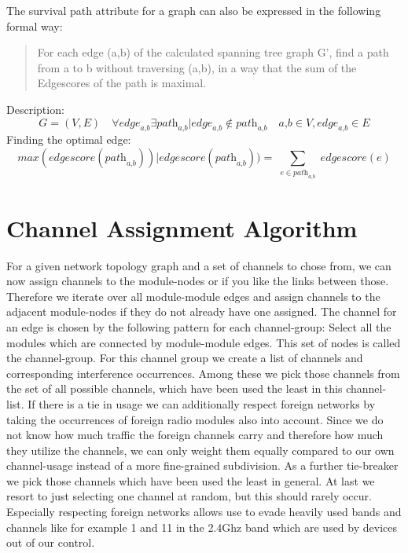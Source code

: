 \newpage

      The survival path attribute for a graph can also be expressed in the following formal way:
      \begin{quote}
	For each edge (a,b) of the calculated spanning tree graph G', find a path from a to b without traversing (a,b), 
	in a way that the sum of the Edgescores of the path is maximal.
      \end{quote}
      Description:
      $$\textit{G}=(\textit{V},\textit{E}) \quad
	\forall \textit{edge}_\textit{a,b} \exists \textit{path}_\textit{a,b} | \textit{edge}_\textit{a,b} \notin \textit{path}_\textit{a,b} \quad
	\textit{a,b} \in \textit{V}, \textit{edge}_\textit{a,b} \in \textit{E}$$
	Finding the optimal edge:
	$$\textit{max}(\textit{edgescore}(\textit{path}_\textit{a,b})) |
	\textit{edgescore}(\textit{path}_\textit{a,b})) = \sum_{\substack{e \in \textit{path}_\textit{a,b}}} \textit{edgescore}(e)$$

  \section{Channel Assignment Algorithm}
    For a given network topology graph and a set of channels to chose from, we can now assign channels to the module-nodes or if you like the links
    between those. Therefore we iterate over all module-module edges and assign channels to the adjacent module-nodes if they do not already have one assigned.
    The channel for an edge is chosen by the following pattern for each channel-group:
    Select all the modules which are connected by module-module edges. This set of nodes is called the channel-group.
    For this channel group we create a list of channels and corresponding interference occurrences.
    Among these we pick those channels from the set of all possible channels, which have been used the least in this channel-list. If there is a tie in usage
    we can additionally respect foreign networks by taking the occurrences of foreign radio modules also into account. Since we do not know how much traffic the foreign 
    channels carry and therefore how much they utilize the channels, we can only weight them equally compared to our own channel-usage instead of a more fine-grained subdivision.
    As a further tie-breaker we pick those channels which have been used the least in general.
    At last we resort to just selecting one channel at random, but this should rarely occur.
    Especially respecting foreign networks allows use to evade heavily used bands and channels like for example 1 and 11 in the 2.4Ghz band which 
    are used by devices out of our control.
    
